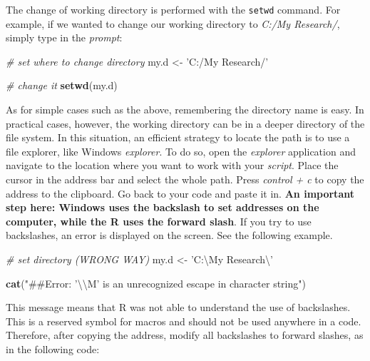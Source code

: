 \documentclass[11pt,]{book}
\newenvironment{Shaded}{\begin{snugshade}}{\end{snugshade}}
\newcommand{\KeywordTok}[1]{\textcolor[rgb]{0.27,0.27,0.27}{\textbf{#1}}}
\newcommand{\CharTok}[1]{\textcolor[rgb]{0.5,0.5,0.5}{#1}}
\newcommand{\StringTok}[1]{\textcolor[rgb]{0.5,0.5,0.5}{#1}}
\newcommand{\CommentTok}[1]{\textcolor[rgb]{0.56,0.35,0.01}{\textit{#1}}}
\newcommand{\NormalTok}[1]{#1}
\begin{document}
The change of working directory is performed with the \texttt{setwd}
command. For example, if we wanted to change our working directory to
\emph{C:/My Research/}, simply type in the \emph{prompt}:

\begin{Shaded}
\begin{Highlighting}[]
\CommentTok{# set where to change directory}
\NormalTok{my.d <-}\StringTok{ 'C:/My Research/'}

\CommentTok{# change it}
\KeywordTok{setwd}\NormalTok{(my.d)}
\end{Highlighting}
\end{Shaded}

As for simple cases such as the above, remembering the directory name is
easy. In practical cases, however, the working directory can be in a
deeper directory of the file system. In this situation, an efficient
strategy to locate the path is to use a file explorer, like Windows
\emph{explorer}. To do so, open the \emph{explorer} application and
navigate to the location where you want to work with your \emph{script}.
Place the cursor in the address bar and select the whole path. Press
\emph{control + c} to copy the address to the clipboard. Go back to your
code and paste it in. \textbf{An important step here: Windows uses the
backslash to set addresses on the computer, while the R uses the forward
slash}. If you try to use backslashes, an error is displayed on the
screen. See the following example.

\begin{Shaded}
\begin{Highlighting}[]
\CommentTok{# set directory (WRONG WAY)}
\NormalTok{my.d <-}\StringTok{ 'C:\textbackslash{}My Research}\CharTok{\textbackslash{}'}
\end{Highlighting}
\end{Shaded}

\begin{Shaded}
\begin{Highlighting}[]
\KeywordTok{cat}\NormalTok{(}\StringTok{"##Error: '}\CharTok{\textbackslash{}\textbackslash{}}\StringTok{M' is an unrecognized escape in character string"}\NormalTok{)}
\end{Highlighting}
\end{Shaded}

This message means that R was not able to understand the use of
backslashes. This is a reserved symbol for macros and should not be used
anywhere in a code. Therefore, after copying the address, modify all
backslashes to forward slashes, as in the following code:
\end{document}
